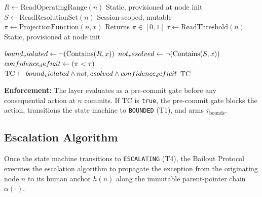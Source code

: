 \begin{algorithm}[t]
\caption{Trigger Condition Evaluation (Pre-Commit Gate)}
\label{alg:tc-eval}
\begin{algorithmic}[1]
  \State $R \gets \text{ReadOperatingRange}(n)$        \Comment Static, provisioned at node init
  \State $S \gets \text{ReadResolutionSet}(n)$        \Comment Session-scoped, mutable
  \State $\pi \gets \text{ProjectionFunction}(n, x)$ \Comment Returns $\pi \in [0,1]$
  \State $\tau \gets \text{ReadThreshold}(n)$          \Comment Static, provisioned at node init

  \State $bound\\_violated \gets \neg(\text{Contains}(R, x))$
  \State $not\\_resolved \gets \neg(\text{Contains}(S, x))$
  \State $confidence\\_deficit \gets (\pi < \tau)$
  \State $\text{TC} \gets bound\\_violated \land not\\_resolved \land confidence\\_deficit$
  \State \Return $\text{TC}$
\EndFunction

\State \textbf{Enforcement:} The \fact{} layer evaluates  as a
\State {}pre-commit gate before any consequential action at $n$
\State {}commits. If TC is \texttt{true}, the pre-commit gate
\State {}blocks the action, transitions the state machine to
\State {}\texttt{BOUNDED} (T1), and arms $\tau_{\text{bounds}}$.
\end{algorithmic}
\end{algorithm}

\subsection{Escalation Algorithm}
\label{sec:bp-escalation}

Once the state machine transitions to \texttt{ESCALATING} (T4), the Bailout Protocol executes the escalation algorithm to propagate the exception from the originating node $n$ to its human anchor $h(n)$ along the immutable parent-pointer chain $\alpha(\cdot)$.

